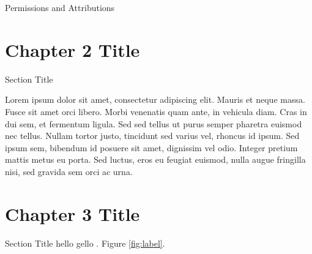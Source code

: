 \documentclass[oneside,12pt,final]{sty/ucthesis-CA2012}
\begin{document}
\begin{mainmatter}
\begin{section}{Permissions and Attributions}
\begin{enumerate}
\end{enumerate}
\end{section}


\chapter{Chapter 2 Title}
\begin{section}{Section Title}

Lorem ipsum dolor sit amet, consectetur adipiscing elit. Mauris et neque massa. Fusce sit amet orci libero. Morbi venenatis quam ante, in vehicula diam. Cras in dui sem, et fermentum ligula. Sed sed tellus ut purus semper pharetra euismod nec tellus. Nullam tortor justo, tincidunt sed varius vel, rhoncus id ipsum. Sed ipsum sem, bibendum id posuere sit amet, dignissim vel odio. Integer pretium mattis metus eu porta. Sed luctus, eros eu feugiat euismod, nulla augue fringilla nisi, sed gravida sem orci ac urna.

\end{section}

\chapter{Chapter 3 Title}

\begin{section}{Section Title}
hello gello 
  \cite{arute_quantum_2019}. Figure \ref{fig:label}.
  

\end{section}
\end{mainmatter}
\end{document}

